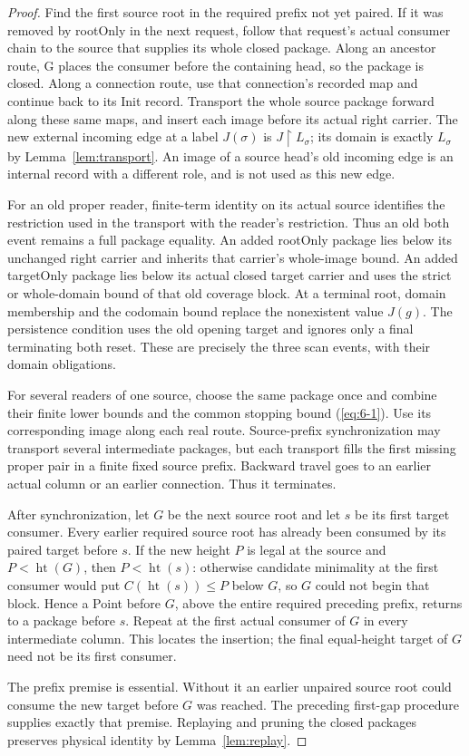 \begin{proof}
Find the first source root in the required prefix not yet paired. If it
was removed by rootOnly in the next request, follow that request's
actual consumer chain to the source that supplies its whole closed
package. Along an ancestor route, G places the consumer before the
containing head, so the package is closed. Along a connection route,
use that connection's recorded map and continue back to its Init record.
Transport the whole source package forward along these same maps, and
insert each image before its actual right carrier. The new external
incoming edge at a label $J(\sigma)$ is $J\restriction L_\sigma$;
its domain is exactly $L_\sigma$ by Lemma~\ref{lem:transport}. An image
of a source head's old incoming edge is an internal record with a
different role, and is not used as this new edge.

For an old proper reader, finite-term identity on its actual source
identifies the restriction used in the transport with the reader's
restriction. Thus an old both event remains a full package equality.
An added rootOnly package lies below its unchanged right carrier and
inherits that carrier's whole-image bound. An added targetOnly package
lies below its actual closed target carrier and uses the strict or
whole-domain bound of that old coverage block. At a terminal root,
domain membership and the codomain bound replace the nonexistent value
$J(g)$. The persistence condition uses the old opening target and
ignores only a final terminating both reset. These are precisely the
three scan events, with their domain obligations.

For several readers of one source, choose the same package once and
combine their finite lower bounds and the common stopping bound (\ref{eq:6-1}).
Use its corresponding image along each real route. Source-prefix
synchronization may transport several intermediate packages, but each
transport fills the first missing proper pair in a finite fixed source
prefix. Backward travel goes to an earlier actual column or an earlier
connection. Thus it terminates.

After synchronization, let $G$ be the next source root and let $s$ be
its first target consumer. Every earlier required source root has
already been consumed by its paired target before $s$. If the new
height $P$ is legal at the source and $P<\operatorname{ht}(G)$, then
$P<\operatorname{ht}(s)$: otherwise candidate minimality at the first
consumer would put $C(\operatorname{ht}(s))\le P$ below $G$, so $G$
could not begin that block. Hence a Point before $G$, above the entire
required preceding prefix, returns to a package before $s$. Repeat at
the first actual consumer of $G$ in every intermediate column. This
locates the insertion; the final equal-height target of $G$ need not
be its first consumer.

The prefix premise is essential. Without it an earlier unpaired source
root could consume the new target before $G$ was reached. The preceding
first-gap procedure supplies exactly that premise. Replaying and
pruning the closed packages preserves physical identity by
Lemma~\ref{lem:replay}.
\end{proof}

